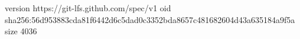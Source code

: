 version https://git-lfs.github.com/spec/v1
oid sha256:56d953883cda81f6442d6c5dad0c3352bda8657c481682604d43a635184a9f5a
size 4036
